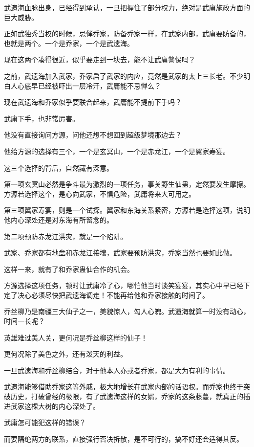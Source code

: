 \begin{this_body}
武遗海血脉出身，已经得到承认，一旦把握住了部分权力，绝对是武庸施政方面的巨大威胁。

正如武独秀当权的时候，忌惮乔家，防备乔家一样，在武家内部，武庸要防备的，也就是两个。一个是乔家，一个是武遗海。

现在这两个凑得很近，似乎要走到一块去，能不让武庸警惕吗？

之前，武遗海加入武家，乔家启了武家的内应，竟然是武家的太上三长老。不少明白人心底早已经被吓出一层冷汗，武庸能不忌惮么？

现在武遗海和乔家似乎要联合起来，武庸能不提前下手吗？

武庸下手，也非常厉害。

他没有直接询问方源，问他还想不想回到超级梦境那边去？

他给方源的选择有三个，一个是玄冥山，一个是赤龙江，一个是翼家寿宴。

这三个选择的背后，自然藏有深意。

第一项玄冥山必然是争斗最为激烈的一项任务，事关野生仙蛊，定然要发生摩擦。方源若选择这个，是心向武家，不惧危险，武庸将来大可用之。

第三项翼家寿宴，则是一个试探。翼家和东海关系紧密，方源若是选择这项，说明他内心深处还是对东海有所留念的。

第二项预防赤龙江洪灾，就是一个陷阱。

武家、乔家都有地盘和赤龙江接壤，武家要预防洪灾，乔家当然也要如此做。

这样一来，就有了和乔家蛊仙合作的机会。

方源选择这项任务，顿时让武庸冷了心，哪怕他当时谈笑宴宴，其实心中早已经下定了决心必须尽快把武遗海调走！不能再给他和乔家接触的时间了。

乔丝柳乃是南疆三大仙子之一，美貌惊人，勾人心魄。武遗海就算一时没有动心，时间一长呢？

英雄难过美人关，更何况是乔丝柳这样的仙子！

更何况除了美色之外，还有泼天的利益。

一旦武遗海和乔丝柳结合，对于他本人亦或者乔家，都是大为有利的事情。

武遗海能够借助乔家这等外戚，极大地增长在武家内部的话语权。而乔家也终于突破历史，打破曾经的极限，有了武遗海这样的女婿，乔家的这条藤蔓，就真正的插进武家这棵大树的内心深处了。

武庸怎可能犯这样的错误？

而要隔绝两方的联系，直接强行否决拆散，是不可行的，搞不好还会适得其反。


\end{this_body}
